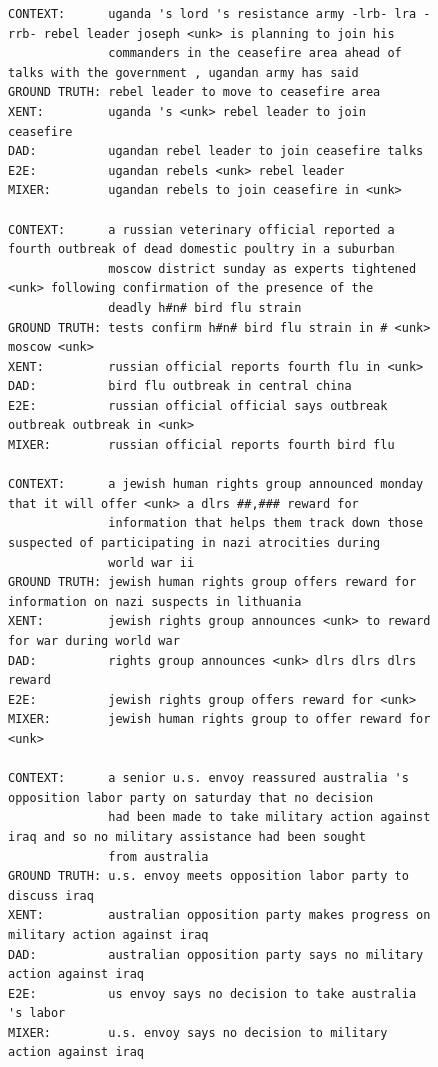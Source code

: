 \begin{figure}[h!]
{\begin{verbatim}
CONTEXT:      uganda 's lord 's resistance army -lrb- lra -rrb- rebel leader joseph <unk> is planning to join his
              commanders in the ceasefire area ahead of talks with the government , ugandan army has said
GROUND TRUTH: rebel leader to move to ceasefire area         
XENT:         uganda 's <unk> rebel leader to join ceasefire
DAD:          ugandan rebel leader to join ceasefire talks
E2E:          ugandan rebels <unk> rebel leader
MIXER:        ugandan rebels to join ceasefire in <unk>

CONTEXT:      a russian veterinary official reported a fourth outbreak of dead domestic poultry in a suburban
              moscow district sunday as experts tightened <unk> following confirmation of the presence of the 
              deadly h#n# bird flu strain
GROUND TRUTH: tests confirm h#n# bird flu strain in # <unk> moscow <unk>
XENT:         russian official reports fourth flu in <unk>
DAD:          bird flu outbreak in central china
E2E:          russian official official says outbreak outbreak outbreak in <unk>
MIXER:        russian official reports fourth bird flu

CONTEXT:      a jewish human rights group announced monday that it will offer <unk> a dlrs ##,### reward for 
              information that helps them track down those suspected of participating in nazi atrocities during 
              world war ii
GROUND TRUTH: jewish human rights group offers reward for information on nazi suspects in lithuania
XENT:         jewish rights group announces <unk> to reward for war during world war
DAD:          rights group announces <unk> dlrs dlrs dlrs reward
E2E:          jewish rights group offers reward for <unk>
MIXER:        jewish human rights group to offer reward for <unk>

CONTEXT:      a senior u.s. envoy reassured australia 's opposition labor party on saturday that no decision 
              had been made to take military action against iraq and so no military assistance had been sought 
              from australia
GROUND TRUTH: u.s. envoy meets opposition labor party to discuss iraq
XENT:         australian opposition party makes progress on military action against iraq
DAD:          australian opposition party says no military action against iraq
E2E:          us envoy says no decision to take australia 's labor
MIXER:        u.s. envoy says no decision to military action against iraq


\end{verbatim}}
\end{figure}
